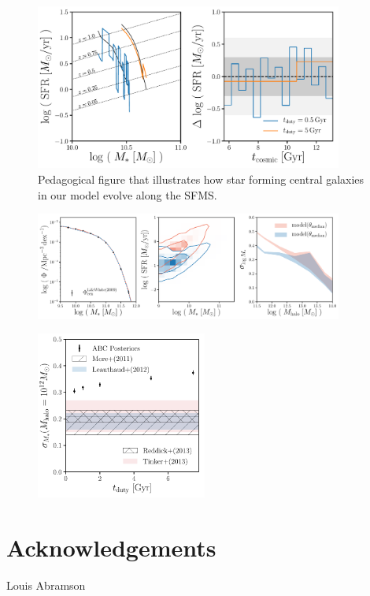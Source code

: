 \documentclass[12pt, letterpaper, preprint]{aastex}
\begin{document}
\begin{figure}
\begin{center}
\includegraphics[width=0.9\textwidth]{figs/sfh_pedagogical.pdf}
\caption{Pedagogical figure that illustrates how star forming central galaxies in our model
evolve along the SFMS.}
\label{fig:sfh_model}
\end{center}
\end{figure}

\begin{figure}
\begin{center}
\includegraphics[width=0.9\textwidth]{figs/qaplot_abc.pdf}
\caption{}
\label{fig:abc_demo}
\end{center}
\end{figure}

\begin{figure}
\begin{center}
\includegraphics[width=0.5\textwidth]{figs/sigMstar_tduty.pdf}
\caption{}
\label{fig:abc_demo}
\end{center}
\end{figure}

\section*{Acknowledgements}
Louis Abramson



\end{document}
